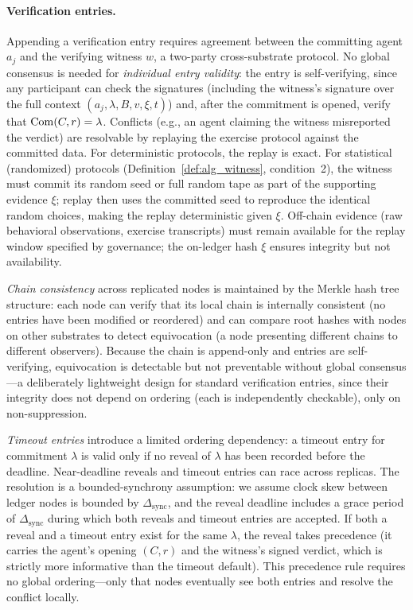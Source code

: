 \paragraph{Verification entries.}
Appending a verification entry requires agreement between the committing
agent $a_j$ and the verifying witness $w$, a two-party cross-substrate
protocol.  No global consensus is needed for \emph{individual entry
validity}: the entry is self-verifying, since any participant can check
the signatures (including the witness's signature over the full context
$(a_j, \lambda, B, v, \xi, t)$) and, after the commitment is opened,
verify that $\mathrm{Com}(C, r) = \lambda$.  Conflicts (e.g., an agent claiming the witness misreported the verdict)
are resolvable by replaying the exercise protocol against the committed
data.  For deterministic protocols, the replay is exact.  For
statistical (randomized) protocols
(Definition~\ref{def:alg_witness}, condition~2), the witness must
commit its random seed or full random tape as part of the supporting
evidence $\xi$; replay then uses the committed seed to reproduce the
identical random choices, making the replay deterministic given $\xi$.
Off-chain evidence (raw behavioral observations, exercise transcripts)
must remain available for the replay window specified by governance;
the on-ledger hash $\xi$ ensures integrity but not availability.

\emph{Chain consistency} across replicated nodes is maintained by the
Merkle hash tree structure: each node can verify that its local chain
is internally consistent (no entries have been modified or reordered)
and can compare root hashes with nodes on other substrates to detect
equivocation (a node presenting different chains to different
observers).  Because the chain is append-only and entries are
self-verifying, equivocation is detectable but not preventable without
global consensus---a deliberately lightweight design for standard
verification entries, since their integrity does not depend on
ordering (each is independently checkable), only on non-suppression.

\emph{Timeout entries} introduce a limited ordering dependency: a
timeout entry for commitment $\lambda$ is valid only if no reveal of
$\lambda$ has been recorded before the deadline.  Near-deadline
reveals and timeout entries can race across replicas.  The resolution
is a bounded-synchrony assumption: we assume clock skew between
ledger nodes is bounded by $\Delta_{\mathrm{sync}}$, and the reveal
deadline includes a grace period of $\Delta_{\mathrm{sync}}$ during
which both reveals and timeout entries are accepted.  If both a reveal
and a timeout entry exist for the same $\lambda$, the reveal takes
precedence (it carries the agent's opening $(C, r)$ and the witness's
signed verdict, which is strictly more informative than the timeout
default).  This precedence rule requires no global ordering---only
that nodes eventually see both entries and resolve the conflict
locally.

